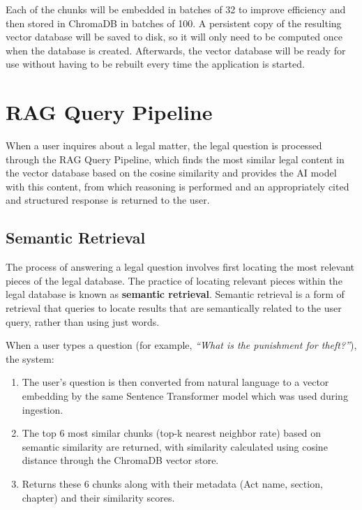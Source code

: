 \documentclass[12pt,a4paper]{article}
\begin{document}
Each of the chunks will be embedded in batches of 32 to improve efficiency and then stored in ChromaDB in batches of 100. A persistent copy of the resulting vector database will be saved to disk, so it will only need to be computed once when the database is created. Afterwards, the vector database will be ready for use without having to be rebuilt every time the application is started.

\section{RAG Query Pipeline}

When a user inquires about a legal matter, the legal question is processed through the RAG Query Pipeline, which finds the most similar legal content in the vector database based on the cosine similarity and provides the AI model with this content, from which reasoning is performed and an appropriately cited and structured response is returned to the user.


\subsection{Semantic Retrieval}


The process of answering a legal question involves first locating the most relevant pieces of the legal database. The practice of locating relevant pieces within the legal database is known as \textbf{semantic retrieval}. Semantic retrieval is a form of retrieval that queries to locate results that are semantically related to the user query, rather than using just words.



When a user types a question (for example, \textit{``What is the punishment for theft?''}), the system:
\begin{enumerate}
  \item The user's question is then converted from natural language to a vector embedding by the same Sentence Transformer model which was used during ingestion.

  \item The top 6 most similar chunks (top-k nearest neighbor rate) based on semantic similarity are returned, with similarity calculated using cosine distance through the ChromaDB vector store.
  \item Returns these 6 chunks along with their metadata (Act name, section, chapter) and their similarity scores.
\end{enumerate}
\end{document}

